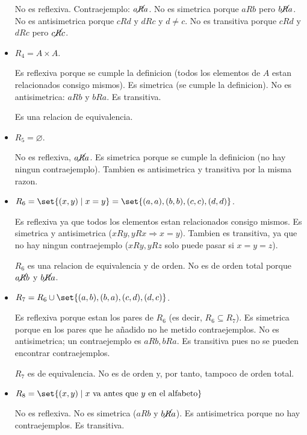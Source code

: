 \begin{example}
\begin{itemize}
		      No es reflexiva. Contraejemplo: \(a \cancel R a \). No es simetrica porque \(aRb \) pero \(b \cancel R a \). No es antisimetrica porque \(cRd \) y \(dRc \) y \(d \neq c\). No es transitiva porque \(cRd \) y \(dRc \) pero \(c \cancel R c \).

		\item \(R_4 = A \times A \).

		      Es reflexiva porque se cumple la definicion (todos los elementos de \(A \) estan relacionados consigo mismos). Es simetrica (se cumple la definicion). No es antisimetrica: \(aRb \) y \(bR a \). Es transitiva.

		      Es una relacion de equivalencia.

		\item \(R_5 = \varnothing \).

		      No es reflexiva, \(a \cancel R a \). Es simetrica porque se cumple la definicion (no hay ningun contraejemplo). Tambien es antisimetrica y transitiva por la misma razon.

		\item \(R_6 = \set{(x,y) \mid x = y } = \set{(a,a), (b,b), (c,c), (d,d)}\).

		      Es reflexiva ya que todos los elementos estan relacionados consigo mismos. Es simetrica y antisimetrica (\(xRy, yRx \Rightarrow x = y \)). Tambien es transitiva, ya que no hay ningun contraejemplo (\(xRy, yRz \) solo puede pasar si \(x=y=z \)).

		      \(R_6 \) es una relacion de equivalencia y de orden. No es de orden total porque \(a \cancel R b \) y \(b \cancel R a \).

		\item \(R_7 = R_6 \cup \set{(a,b), (b,a), (c,d), (d,c)}\).

		      Es reflexiva porque estan los pares de \(R_6 \) (es decir, \(R_6 \subseteq R_7 \)). Es simetrica porque en los pares que he añadido no he metido contraejemplos. No es antisimetrica; un contraejemplo es \(aRb, bRa \). Es transitiva pues no se pueden encontrar contraejemplos.

		      \(R_7 \) es de equivalencia. No es de orden y, por tanto, tampoco de orden total.

		\item \(R_8 = \set{(x,y) \mid x \text{ va antes que } y \text{ en el alfabeto} }\)

		      No es reflexiva. No es simetrica (\(aRb \) y \(b \cancel R a \)). Es antisimetrica porque no hay contraejemplos. Es transitiva.


\end{itemize}
\end{example}
